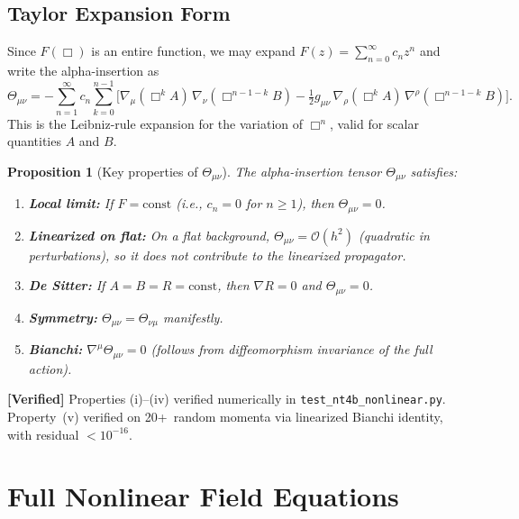 \documentclass[11pt,a4paper]{article}
\newcommand{\ie}{\textit{i.e.}}
\theoremstyle{plain}
\newtheorem{proposition}[theorem]{Proposition}
\theoremstyle{definition}
\newcommand{\verified}[1]{%
  \par\smallskip\noindent
  \colorbox{green!10}{\parbox{\dimexpr\linewidth-2\fboxsep}{%
    \textcolor{green!50!black}{\textbf{[Verified]}} #1}}%
  \par\smallskip}
\begin{document}
\subsection{Taylor Expansion Form}

Since $F(\Box)$ is an entire function, we may expand
$F(z) = \sum_{n=0}^{\infty} c_n z^n$ and write the alpha-insertion as
\begin{equation}\label{eq:alpha-taylor}
  \Theta_{\mu\nu} = -\sum_{n=1}^{\infty} c_n
  \sum_{k=0}^{n-1}
  \bigl[\nabla_\mu(\Box^k A)\,\nabla_\nu(\Box^{n-1-k} B)
  - \tfrac{1}{2}g_{\mu\nu}\,\nabla_\rho(\Box^k A)\,
  \nabla^\rho(\Box^{n-1-k} B)\bigr].
\end{equation}
This is the Leibniz-rule expansion for the variation of $\Box^n$, valid
for scalar quantities $A$ and $B$.

\begin{proposition}[Key properties of $\Theta_{\mu\nu}$]
\label{prop:theta-properties}
The alpha-insertion tensor $\Theta_{\mu\nu}$ satisfies:
\begin{enumerate}[nosep,label=(\roman*)]
  \item \textbf{Local limit:} If $F = \mathrm{const}$ (\ie, $c_n = 0$
    for $n \geq 1$), then $\Theta_{\mu\nu} = 0$.
  \item \textbf{Linearized on flat:} On a flat background,
    $\Theta_{\mu\nu} = \mathcal{O}(h^2)$ (quadratic in perturbations),
    so it does not contribute to the linearized propagator.
  \item \textbf{De Sitter:} If $A = B = R = \mathrm{const}$, then
    $\nabla R = 0$ and $\Theta_{\mu\nu} = 0$.
  \item \textbf{Symmetry:} $\Theta_{\mu\nu} = \Theta_{\nu\mu}$ manifestly.
  \item \textbf{Bianchi:} $\nabla^\mu\Theta_{\mu\nu} = 0$ (follows from
    diffeomorphism invariance of the full action).
\end{enumerate}
\end{proposition}

\verified{Properties (i)--(iv) verified numerically in
\texttt{test\_nt4b\_nonlinear.py}. Property~(v) verified on 20+~random
momenta via linearized Bianchi identity, with residual $< 10^{-16}$.}

\section{Full Nonlinear Field Equations}\label{sec:field-eqs}
\end{document}

